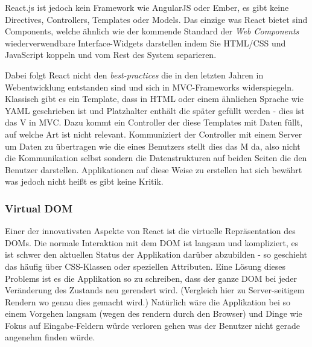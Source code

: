 \documentclass[12pt,twoside]{book}
\begin{document}
React.js ist jedoch kein Framework wie AngularJS oder Ember, es gibt keine Directives, Controllers, Templates oder Models. Das einzige was React bietet sind Components, welche ähnlich wie der kommende Standard der \textit{Web Components}\cite{webcomponents} wiederverwendbare Interface-Widgets darstellen indem Sie HTML/CSS und JavaScript koppeln und vom Rest des System separieren.

Dabei folgt React nicht den \textit{best-practices} die in den letzten Jahren in Webentwicklung entstanden sind und sich in MVC-Frameworks widerspiegeln. Klassisch gibt es ein Template, dass in HTML oder einem ähnlichen Sprache wie YAML geschrieben ist und Platzhalter enthält die später gefüllt werden - dies ist das V in MVC.
Dazu kommt ein Controller der diese Templates mit Daten füllt, auf welche Art ist nicht relevant. Kommuniziert der Controller mit einem Server um Daten zu übertragen wie die eines Benutzers stellt dies das M da, also nicht die Kommunikation selbst sondern die Datenstrukturen auf beiden Seiten die den Benutzer darstellen.
Applikationen auf diese Weise zu erstellen hat sich bewährt was jedoch nicht heißt es gibt keine Kritik.

\subsubsection{Virtual DOM}

Einer der innovativsten Aspekte von React ist die virtuelle Repräsentation des DOMs\cite{DOM}. Die normale Interaktion mit dem DOM ist langsam und kompliziert, es ist schwer den aktuellen Status der Applikation darüber abzubilden - so geschieht das häufig über CSS-Klassen oder speziellen Attributen.
Eine Lösung dieses Problems ist es die Applikation so zu schreiben, dass der ganze DOM bei jeder Veränderung des Zustands neu gerendert wird. (Vergleich hier zu Server-seitigem Rendern wo genau dies gemacht wird.) Natürlich wäre die Applikation bei so einem Vorgehen langsam (wegen des rendern durch den Browser) und Dinge wie Fokus auf Eingabe-Feldern würde verloren gehen was der Benutzer nicht gerade angenehm finden würde.
\end{document}
